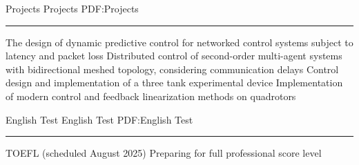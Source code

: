 \documentclass[letterpaper,MMMyyyy]{CVTemplate}
\begin{document}
\begin{Body}
\Gap
\endgroup




\Section
{Projects}
{Projects}
{PDF:Projects}
\textcolor{Forestg}{\vspace{0.10cm}\hrule height 0.1cm}\BigGap\Gap
\vspace{6pt}
\BulletItem
The design of dynamic predictive control for networked control systems subject to latency and packet loss
\vspace{6pt}
\BulletItem
Distributed control of second-order multi-agent systems with bidirectional meshed topology, considering communication delays
\vspace{6pt}
\BulletItem
Control design and implementation of a three tank experimental device
\vspace{6pt}
\BulletItem
Implementation of modern control and feedback linearization methods on quadrotors

\Section
{English Test}
{English Test}
{PDF:English Test}
\textcolor{Forestg}{\vspace{0.10cm}\hrule height 0.1cm}\BigGap\Gap
\BulletItem
TOEFL (scheduled August 2025)
\newline
Preparing for full professional score level



\end{Body}
\end{document}
